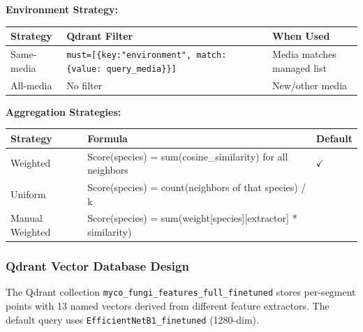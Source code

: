 \textbf{Environment Strategy:}

\begin{center}
\begin{tabular}{@{}p{3cm} p{4.5cm} p{6.5cm}@{}}
\toprule
\textbf{Strategy} & \textbf{Qdrant Filter} & \textbf{When Used} \\
\midrule
Same-media & \texttt{must={[}\{key:"environment",\ match:\{value:\ query\_media\}\}{]}} & Media matches managed list \\
All-media & No filter & New/other media \\
\bottomrule
\end{tabular}
\end{center}

\textbf{Aggregation Strategies:}

\begin{center}
\begin{tabular}{@{}p{3cm} p{4.5cm} p{6.5cm}@{}}
\toprule
\textbf{Strategy} & \textbf{Formula} & \textbf{Default} \\
\midrule
Weighted & Score(species) = sum(cosine\_similarity) for all neighbors & $\checkmark$ \\
Uniform & Score(species) = count(neighbors of that species) / k & \\
Manual Weighted & Score(species) = sum(weight{[}species{]}{[}extractor{]} * similarity) & \\
\bottomrule
\end{tabular}
\end{center}

\subsubsection{Qdrant Vector Database Design}\label{qdrant-vector-database-design}

The Qdrant collection \texttt{myco\_fungi\_features\_full\_finetuned} stores per-segment points with 13 named vectors derived from different feature extractors. The default query uses \texttt{EfficientNetB1\_finetuned} (1280-dim).

